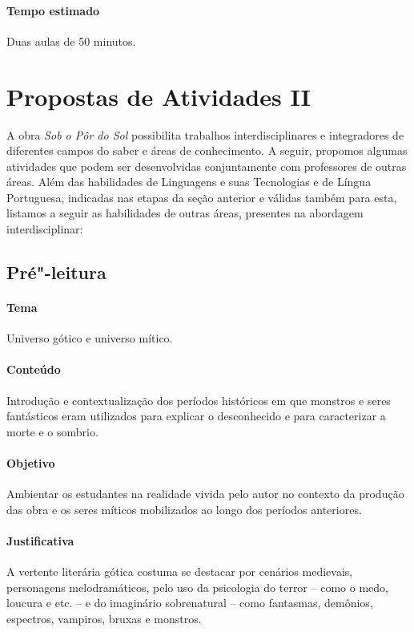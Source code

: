 \documentclass[12pt]{extarticle}
\begin{document}
\paragraph{Tempo estimado} Duas aulas de 50 minutos. 


\section{Propostas de Atividades II}

A obra \emph{Sob o Pôr do Sol} possibilita trabalhos interdisciplinares
e integradores de diferentes campos do saber e áreas de conhecimento. A
seguir, propomos algumas atividades que podem ser desenvolvidas
conjuntamente com professores de outras áreas. Além das habilidades de
Linguagens e suas Tecnologias e de Língua Portuguesa, indicadas nas
etapas da seção anterior e válidas também para esta, listamos a seguir
as habilidades de outras áreas, presentes na abordagem interdisciplinar:


\subsection{Pré"-leitura} 

\paragraph{Tema} Universo gótico e universo mítico.

\paragraph{Conteúdo} Introdução e contextualização dos períodos históricos
em que monstros e seres fantásticos eram utilizados para explicar o desconhecido e 
para caracterizar a morte e o sombrio. 

\paragraph{Objetivo} Ambientar os estudantes na realidade vivida pelo autor no contexto 
da produção das obra e os seres míticos mobilizados ao longo dos períodos anteriores. 

\paragraph{Justificativa} A vertente literária gótica costuma se destacar por cenários medievais,
personagens melodramáticos, pelo uso da psicologia do terror -- como o medo,
loucura e etc. -- e do imaginário sobrenatural -- como fantasmas,
demônios, espectros, vampiros, bruxas e monstros.
\end{document}
